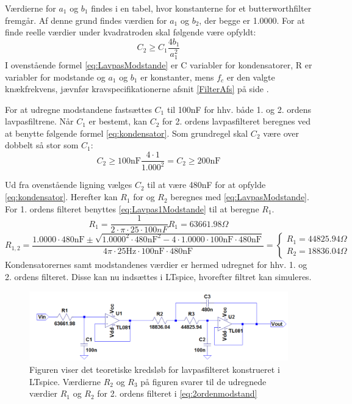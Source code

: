\noindent Værdierne for $a_{1}$ og $b_{1}$ findes i en tabel, hvor konstanterne for et butterworthfilter fremgår. Af denne grund findes værdien for $a_{1}$  og  $b_{2}$, der begge er 1.0000. For at finde reelle værdier under kvadratroden skal følgende være opfyldt:
\begin{equation} \label{eq:kondensator}
C_2 \geq C_1 \frac{4b_1}{a_1^2}
\end{equation}
I ovenstående formel \eqref{eq:LavpasModstande} er C variabler for kondensatorer, R er variabler for modstande og $a_1$ og $b_1$ er konstanter, mens $f_c$ er den valgte knækfrekvens, jævnfør kravspecifikationerne afsnit \ref{FilterAfs} på side \pageref{FilterAfs}. 

\noindent For at udregne modstandene fastsættes $C_1$ til 100nF for hhv. både 1. og 2. ordens lavpasfiltrene. Når $C_1$ er bestemt, kan $C_2$ for 2. ordens lavpasfilteret beregnes ved at benytte følgende formel \eqref{eq:kondensator}. Som grundregel skal $C_2$ være over dobbelt så stor som $C_1$:
\begin{equation}  
C_2 \geq 100\text{nF} \frac{4\cdot 1}{1.000^2} = C_2 \geq 200\text{nF}
\end{equation}

\noindent Ud fra ovenstående ligning vælges $C_2$ til at være 480nF for at opfylde \eqref{eq:kondensator}.  Herefter kan $R_1$ for og $R_2$ beregnes med \eqref{eq:LavpasModstande}. For 1. ordens filteret benyttes \eqref{eq:Lavpas1Modstande} til at beregne $R_1$.
\begin{equation} \label{eq:Lavpas1Modstande}
R_{1} = \frac{1}{2 \cdot \pi \cdot 25 \cdot 100nF} R_{1} = 63661.98 \Omega
\end{equation}
\begin{equation} \label{eq:2ordenmodstand}
R_{1,2} = \frac{1.0000 \cdot 480\text{nF} \pm \sqrt{1.0000^2 \cdot 480\text{nF}^2 - 4 \cdot 1.0000 \cdot 100\text{nF} \cdot 480\text{nF}}}{4 \pi \cdot 25\text{Hz} \cdot 100\text{nF} \cdot 480\text{nF}} = \begin{cases} R_{1} =  44825.94\Omega \\ R_{2} = 18836.04 \Omega \end{cases}
\end{equation}
\noindent Kondensatorernes samt modstandenes værdier er hermed udregnet for hhv. 1. og 2. ordens filteret. Disse kan nu indsættes i LTspice, hvorefter filtret kan simuleres. 

\begin{figure}[H]
	\centering
	\includegraphics[scale=0.5]{figures/cProblemloesning/Lavpasfilter1_LTspice.PNG}
	\caption{Figuren viser det teoretiske kredsløb for lavpasfilteret konstrueret i LTspice. Værdierne $R_{2}$ og $R_{3}$ på figuren svarer til de udregnede værdier $R_{1}$ og $R_{2}$ for 2. ordens filteret i \eqref{eq:2ordenmodstand}}
	\label{fig:lavpasfilter1_LTspice}
\end{figure}

